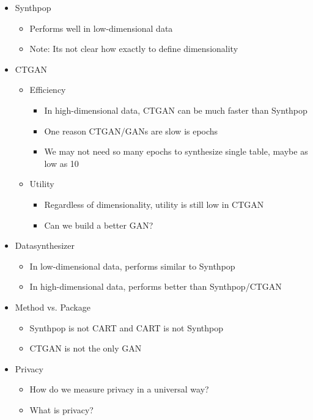 \documentclass[10pt]{article} %
\begin{document}
\begin{itemize}
    \item Synthpop 
    \begin{itemize}
        \item Performs well in low-dimensional data
        \item Note: Its not clear how exactly to define dimensionality
    \end{itemize}
    \item CTGAN
    \begin{itemize}
        \item Efficiency
        \begin{itemize}
            \item In high-dimensional data, CTGAN can be much faster than Synthpop
            \item One reason CTGAN/GANs are slow is epochs
            \item We may not need so many epochs to synthesize single table, maybe as low as 10
        \end{itemize}
        \item Utility
        \begin{itemize}
            \item Regardless of dimensionality, utility is still low in CTGAN
            \item Can we build a better GAN?
        \end{itemize}
    \end{itemize}
    \item Datasynthesizer
    \begin{itemize}
        \item In low-dimensional data, performs similar to Synthpop
        \item In high-dimensional data, performs better than Synthpop/CTGAN
    \end{itemize}
    \item Method vs. Package
    \begin{itemize}
        \item Synthpop is not CART and CART is not Synthpop
        \item CTGAN is not the only GAN
    \end{itemize}
    \item Privacy
    \begin{itemize}
        \item How do we measure privacy in a universal way?
        \item What is privacy?
    \end{itemize}
\end{itemize}
\end{document}
